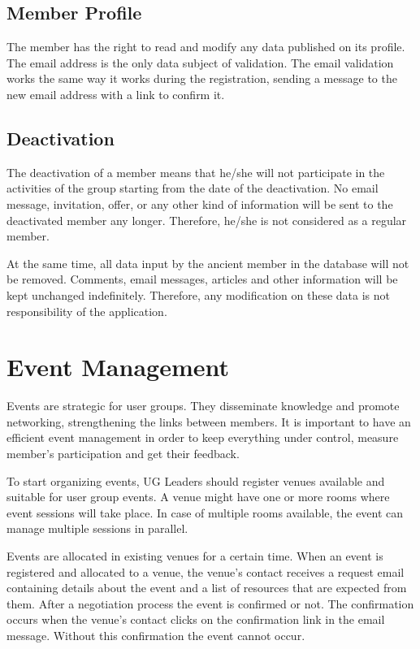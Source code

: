 \documentclass[envcountsame,envcountchap]{svmono}
\begin{document}
\section{Member Profile}

The member has the right to read and modify any data published on its profile. The email address is the only data subject of validation. The email validation works the same way it works during the registration, sending a message to the new email address with a link to confirm it.

\section{Deactivation}

The deactivation of a member means that he/she will not participate in the activities of the group  starting from the date of the deactivation. No email message, invitation, offer, or any other kind of information will be sent to the deactivated member any longer. Therefore, he/she is not considered as a regular member.

At the same time, all data input by the ancient member in the database will not be removed. Comments, email messages, articles and other information will be kept unchanged indefinitely. Therefore, any modification on these data is not responsibility of the application.

\chapter{Event Management}
\label{chp:event-management}

Events are strategic for user groups. They disseminate knowledge and promote networking, strengthening the links between members. It is important to have an efficient event management in order to keep everything under control, measure member's participation and get their feedback.

To start organizing events, UG Leaders should register venues available and suitable for user group events. A venue might have one or more rooms where event sessions will take place. In case of multiple rooms available, the event can manage multiple sessions in parallel.

Events are allocated in existing venues for a certain time. When an event is registered and allocated to a venue, the venue's contact receives a request email containing details about the event and a list of resources that are expected from them. After a negotiation process the event is confirmed or not. The confirmation occurs when the venue's contact clicks on the confirmation link in the email message. Without this confirmation the event cannot occur.
\end{document}
